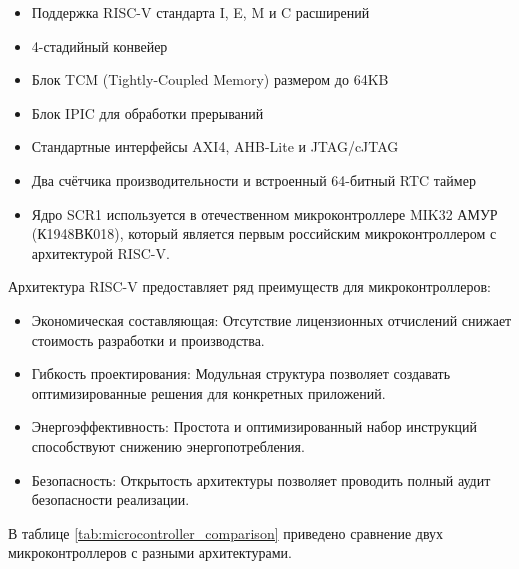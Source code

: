 \begin{itemize}
	\item Поддержка RISC-V стандарта I, E, M и C расширений
	\item 4-стадийный конвейер
	\item Блок TCM (Tightly-Coupled Memory) размером до 64KB
	\item Блок IPIC для обработки прерываний
	\item Стандартные интерфейсы AXI4, AHB-Lite и JTAG/cJTAG
	\item Два счётчика производительности и встроенный 64-битный RTC таймер
	\item Ядро SCR1 используется в отечественном микроконтроллере MIK32 АМУР (К1948ВК018), который является первым российским микроконтроллером с архитектурой RISC-V.
\end{itemize}

Архитектура RISC-V предоставляет ряд преимуществ для микроконтроллеров:

\begin{itemize}
	\item Экономическая составляющая: Отсутствие лицензионных отчислений снижает стоимость разработки и производства.
	\item Гибкость проектирования: Модульная структура позволяет создавать оптимизированные решения для конкретных приложений.
	\item Энергоэффективность: Простота и оптимизированный набор инструкций способствуют снижению энергопотребления.
	\item Безопасность: Открытость архитектуры позволяет проводить полный аудит безопасности реализации.
\end{itemize}

В таблице \ref{tab:microcontroller_comparison} приведено сравнение двух микроконтроллеров с разными архитектурами.


